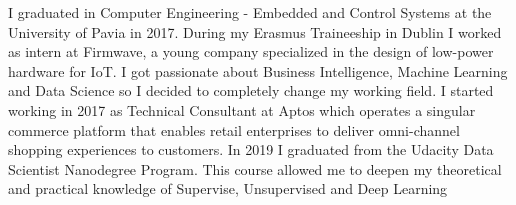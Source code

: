\documentclass[9pt]{developercv} %
\begin{document}
\begin{minipage}[t]{0.5\textwidth} %
	\vspace{-\baselineskip} %
	
	I graduated in Computer Engineering - Embedded and Control Systems at the University of Pavia in 2017. During my Erasmus Traineeship in Dublin I worked as intern at Firmwave, a young company specialized in the design of low-power hardware for IoT. I got passionate about Business Intelligence, Machine Learning and Data Science so I decided to completely change my working field. I started working in 2017 as Technical Consultant at Aptos which operates a singular commerce platform that enables retail enterprises to deliver omni-channel shopping experiences to customers. In 2019 I graduated from the Udacity Data Scientist Nanodegree Program. This course allowed me to deepen my theoretical and practical knowledge of Supervise, Unsupervised and Deep Learning
\end{minipage}
\hfill %
\begin{minipage}[t]{0.4\textwidth} %
	\vspace{-\baselineskip} %
	\begin{barchart}{5.5}
	\end{barchart}
\end{minipage}

\begin{center}
\end{center}


\end{document}
